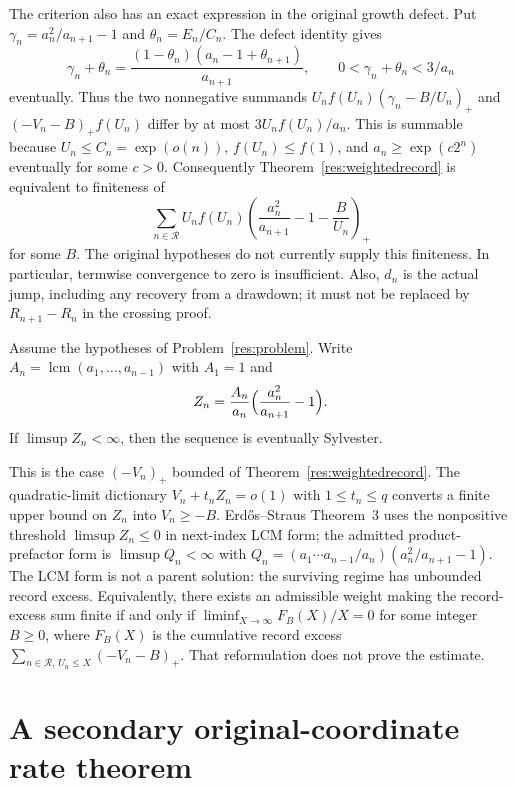 \documentclass[11pt]{article}
\begin{document}
The criterion also has an exact expression in the original growth defect.
Put $\gamma_n=a_n^2/a_{n+1}-1$ and $\theta_n=E_n/C_n$. The defect identity
gives
\[
 \gamma_n+\theta_n=
 \frac{(1-\theta_n)(a_n-1+\theta_{n+1})}{a_{n+1}},
 \qquad 0<\gamma_n+\theta_n<3/a_n
\]
eventually. Thus the two nonnegative summands
$U_nf(U_n)(\gamma_n-B/U_n)_+$ and $(-V_n-B)_+f(U_n)$ differ by at most
$3U_nf(U_n)/a_n$. This is summable because
$U_n\le C_n=\exp(o(n))$, $f(U_n)\le f(1)$, and
$a_n\ge\exp(c2^n)$ eventually for some $c>0$.
Consequently Theorem~\ref{res:weightedrecord} is equivalent to finiteness of
\begin{equation}\label{eq:weightedgrowth}
 \sum_{n\in\mathcal R}U_nf(U_n)
 \left(\frac{a_n^2}{a_{n+1}}-1-\frac B{U_n}\right)_+
\end{equation}
for some $B$. The original hypotheses do not currently supply this
finiteness. In particular, termwise convergence to zero is insufficient.
Also, $d_n$ is the actual jump, including any recovery from a drawdown; it
must not be replaced by $R_{n+1}-R_n$ in the crossing proof.

\begin{corollary}\label{res:lcmbounded}
Assume the hypotheses of Problem~\ref{res:problem}. Write
$A_n=\operatorname{lcm}(a_1,\ldots,a_{n-1})$ with $A_1=1$ and
\[
 Z_n=\frac{A_n}{a_n}\Bigl(\frac{a_n^2}{a_{n+1}}-1\Bigr).
\]
If $\limsup Z_n<\infty$, then the sequence is eventually Sylvester.
\end{corollary}

This is the case $(-V_n)_+$ bounded of Theorem~\ref{res:weightedrecord}.  The
quadratic-limit dictionary $V_n+t_n Z_n=o(1)$ with $1\le t_n\le q$ converts a
finite upper bound on $Z_n$ into $V_n\ge -B$.  Erdős--Straus Theorem~3 uses
the nonpositive threshold $\limsup Z_n\le 0$ in next-index LCM form; the
admitted product-prefactor form is $\limsup Q_n<\infty$ with
$Q_n=(a_1\cdots a_{n-1}/a_n)(a_n^2/a_{n+1}-1)$.  The LCM form is not a parent
solution: the surviving regime has unbounded record excess.  Equivalently,
there exists an admissible weight making the record-excess sum finite if and
only if $\liminf_{X\to\infty} F_B(X)/X=0$ for some integer $B\ge0$, where
$F_B(X)$ is the cumulative record excess $\sum_{n\in\mathcal R,\,U_n\le X}(-V_n-B)_+$.
That reformulation does not prove the estimate.

\section{A secondary original-coordinate rate theorem}\label{sec:secondaryrate}
\end{document}

